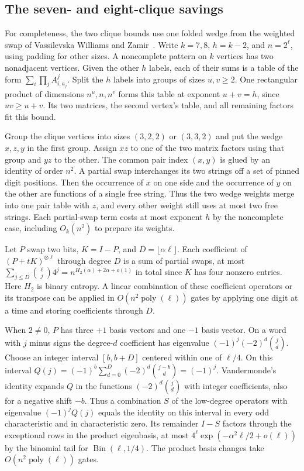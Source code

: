 \documentclass[11pt,letterpaper]{article}
\begin{document}
\subsection{The seven- and eight-clique savings}\label{the-two-clique-savings}

For completeness, the two clique bounds use one folded wedge from the weighted swap of Vassilevska Williams and Zamir~\cite[Lemmas~3.1--3.3]{vw-zamir}. Write \(k=7,8\), \(h=k-2\), and \(n=2^\ell\), using padding for other sizes. A noncomplete pattern on \(k\) vertices has two nonadjacent vertices. Given the other \(h\) labels, each of their sums is a table of the form \(\sum_i\prod_j A^j_{i,a_j}\). Split the \(h\) labels into groups of sizes \(u,v\ge2\). One rectangular product of dimensions \(n^u,n,n^v\) forms this table at exponent \(u+v=h\), since \(uv\ge u+v\). Its two matrices, the second vertex's table, and all remaining factors fit this bound.

Group the clique vertices into sizes \((3,2,2)\) or \((3,3,2)\) and put the wedge \(x,z,y\) in the first group. Assign \(xz\) to one of the two matrix factors using that group and \(yz\) to the other. The common pair index \((x,y)\) is glued by an identity of order \(n^2\). A partial swap interchanges its two strings off a set of pinned digit positions. Then the occurrence of \(x\) on one side and the occurrence of \(y\) on the other are functions of a single free string. Thus the two wedge weights merge into one pair table with \(z\), and every other weight still uses at most two free strings. Each partial-swap term costs at most exponent \(h\) by the noncomplete case, including \(O_k(n^2)\) to prepare its weights.

Let \(P\) swap two bits, \(K=I-P\), and \(D=\lfloor\alpha\ell\rfloor\). Each coefficient of \((P+tK)^{\otimes\ell}\) through degree \(D\) is a sum of partial swaps, at most \(\sum_{j\le D}\binom{\ell}{j}4^j=n^{H_2(\alpha)+2\alpha+o(1)}\) in total since \(K\) has four nonzero entries. Here \(H_2\) is binary entropy. A linear combination of these coefficient operators or its transpose can be applied in \(O(n^2\operatorname{poly}(\ell))\) gates by applying one digit at a time and storing coefficients through \(D\).

When \(2\ne0\), \(P\) has three \(+1\) basis vectors and one \(-1\) basis vector. On a word with \(j\) minus signs the degree-\(d\) coefficient has eigenvalue \((-1)^j(-2)^d\binom jd\). Choose an integer interval \([b,b+D]\) centered within one of \(\ell/4\). On this interval \(Q(j)=(-1)^b\sum_{d=0}^D(-2)^d\binom{j-b}{d}=(-1)^j\). Vandermonde's identity expands \(Q\) in the functions \((-2)^d\binom jd\) with integer coefficients, also for a negative shift \(-b\). Thus a combination \(S\) of the low-degree operators with eigenvalue \((-1)^jQ(j)\) equals the identity on this interval in every odd characteristic and in characteristic zero. Its remainder \(I-S\) factors through the exceptional rows in the product eigenbasis, at most \(4^\ell\exp(-\alpha^2\ell/2+o(\ell))\) by the binomial tail for \(\operatorname{Bin}(\ell,1/4)\). The product basis changes take \(O(n^2\operatorname{poly}(\ell))\) gates.
\end{document}
